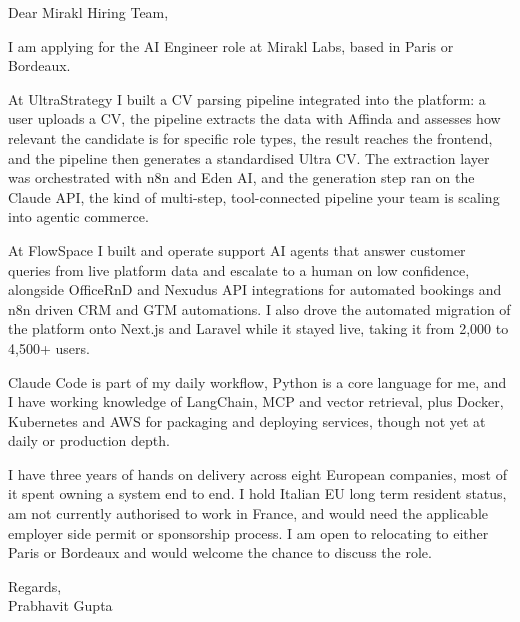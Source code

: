 \documentclass[a4paper,11pt]{article}
\begin{document}
Dear Mirakl Hiring Team,

I am applying for the AI Engineer role at Mirakl Labs, based in Paris or Bordeaux.

At UltraStrategy I built a CV parsing pipeline integrated into the platform: a user uploads a CV, the pipeline extracts the data with Affinda and assesses how relevant the candidate is for specific role types, the result reaches the frontend, and the pipeline then generates a standardised Ultra CV. The extraction layer was orchestrated with n8n and Eden AI, and the generation step ran on the Claude API, the kind of multi-step, tool-connected pipeline your team is scaling into agentic commerce.

At FlowSpace I built and operate support AI agents that answer customer queries from live platform data and escalate to a human on low confidence, alongside OfficeRnD and Nexudus API integrations for automated bookings and n8n driven CRM and GTM automations. I also drove the automated migration of the platform onto Next.js and Laravel while it stayed live, taking it from 2,000 to 4,500+ users.

Claude Code is part of my daily workflow, Python is a core language for me, and I have working knowledge of LangChain, MCP and vector retrieval, plus Docker, Kubernetes and AWS for packaging and deploying services, though not yet at daily or production depth.

I have three years of hands on delivery across eight European companies, most of it spent owning a system end to end. I hold Italian EU long term resident status, am not currently authorised to work in France, and would need the applicable employer side permit or sponsorship process. I am open to relocating to either Paris or Bordeaux and would welcome the chance to discuss the role.

Regards,\\
Prabhavit Gupta
\end{document}
